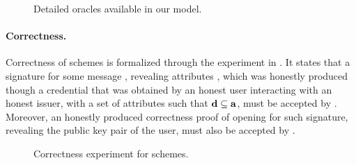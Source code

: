 {\begin{figure*}[htp!]
{\begin{minipage}[t]{.5\textwidth}
        
      \end{minipage}
      
    }

    \caption{Detailed oracles available in our model.}
    \label{fig:oracles}
  \end{figure*}
}

\paragraph{Correctness.} %
Correctness of \GSAC schemes is formalized through the experiment in
. It states that a signature for some message \msg,
revealing attributes \dattrs, which was honestly produced though a credential
that was obtained by an honest user interacting with an honest issuer, with a
set of attributes \attrs such that $\mathbf{d} \subseteq \mathbf{a}$, must be accepted
by \Verify. Moreover, an honestly produced correctness proof of opening for such
signature, revealing the public key pair of the user, must also be accepted by
\Judge.

\begin{figure}[htp!]
  \caption{Correctness experiment for \GSAC schemes.}
  \label{fig:exp-gsac-corr}
\end{figure}

